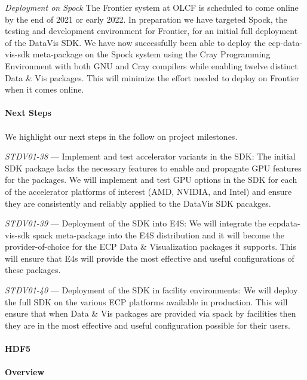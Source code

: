 \textit{Deployment on Spock} The Frontier system at OLCF is scheduled to come online by the end of 2021 or early 2022. In preparation we have targeted Spock, the testing and development environment for Frontier, for an initial full deployment of the DataVis SDK.  We have now successfully been able to deploy the ecp-data-vis-sdk meta-package on the Spock system using the Cray Programming Environment with both GNU and Cray compilers while enabling twelve distinct Data \& Vis packages.  This will minimize the effort needed to deploy on Frontier when it comes online.

\paragraph{\textbf{Next Steps}}
\paragraph{}

We highlight our next steps in the follow on project milestones.

\textit{STDV01-38} --- Implement and test accelerator variants in the SDK: The initial SDK package lacks the necessary features to enable and propagate GPU features for the packages.  We will implement and test GPU options in the SDK for each of the accelerator platforms of interest (AMD, NVIDIA, and Intel) and ensure they are consistently and reliably applied to the DataVis SDK pacakges.

\textit{STDV01-39} --- Deployment of the SDK into E4S: We will integrate the ecpdata-vis-sdk spack meta-package into the E4S distribution and it will become the provider-of-choice for the ECP Data \& Visualization packages it supports.  This will ensure that E4s will provide the most effective and useful configurations of these packages.

\textit{STDV01-40} --- Deployment of the SDK in facility environments: We will deploy the full SDK on the various ECP platforms available in production.  This will ensure that when Data \& Vis packages are provided via spack by facilities then they are in the most effective and useful configuration possible for their users.

\paragraph{HDF5}
\paragraph{Overview}
